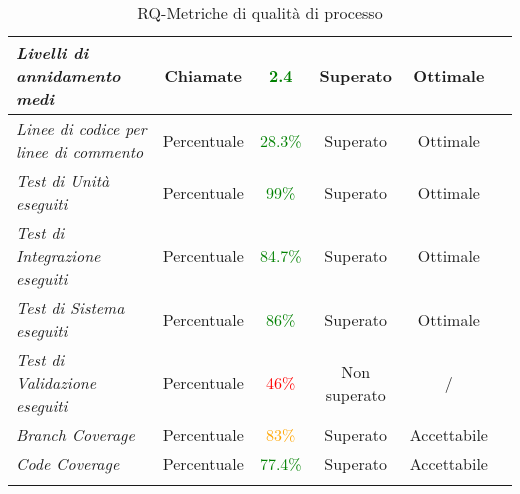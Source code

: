 \begin{longtable}{|>{\centering}m{5cm}|c|c|c|c|c|}
\emph{Livelli di annidamento medi} & {Chiamate} & \textcolor{Green}{2.4} & Superato & Ottimale\\ \hline
\emph{Linee di codice per linee di commento} & {Percentuale} & \textcolor{Green}{28.3\%} & Superato & Ottimale\\ \hline
\emph{Test di Unità eseguiti} & {Percentuale} & \textcolor{Green}{99\%} & Superato & Ottimale\\ \hline
\emph{Test di Integrazione eseguiti} & {Percentuale} & \textcolor{Green}{84.7\%} & Superato & Ottimale\\ \hline
\emph{Test di Sistema eseguiti} & {Percentuale} & \textcolor{Green}{86\%} & Superato & Ottimale\\ \hline
\emph{Test di Validazione eseguiti} & {Percentuale} & \textcolor{Red}{46\%} & Non superato & / \\ \hline
\emph{Branch Coverage} & {Percentuale} & \textcolor{Orange}{83\%} & Superato & Accettabile\\ \hline
\emph{Code Coverage} & {Percentuale} & \textcolor{Green}{77.4\%} & Superato & Accettabile\\ \hline
\caption{RQ-Metriche di qualità di processo}\\
\end{longtable}

